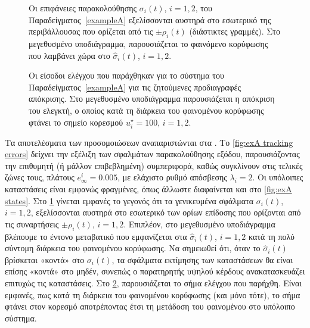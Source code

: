 \begin{figure}[tb]
    \centering
    
    \caption{Οι επιφάνειες παρακολούθησης $\sigma_i(t)$, $i= 1,2$, του Παραδείγματος~\ref{exampleA} εξελίσσονται αυστηρά στο εσωτερικό της περιβάλλουσας που ορίζεται από τις $\pm \rho_i(t)$ (διάστικτες γραμμές). Στο μεγεθυσμένο υποδιάγραμμα, παρουσιάζεται το φαινόμενο κορύφωσης που λαμβάνει χώρα στο $\hat \sigma_i(t)$, $i= 1,2$.}
    \label{fig:exA surfaces}
\end{figure}

\begin{figure}[tb]
    \centering
    
    \caption{Οι είσοδοι ελέγχου που παράχθηκαν για το σύστημα του Παραδείγματος~\ref{exampleA} για τις ζητούμενες προδιαγραφές απόκρισης. Στο μεγεθυσμένο υποδιάγραμμα παρουσιάζεται η απόκριση του ελεγκτή, ο οποίος κατά τη διάρκεια του φαινομένου κορύφωσης φτάνει το σημείο κορεσμού $u_i^\star = 100$, $i =1,2$.}
    \label{fig:exA controls}
\end{figure}

Τα αποτελέσματα των προσομοιώσεων αναπαριστώνται στα . Το \cref{fig:exA tracking errors} δείχνει την εξέλιξη των σφαλμάτων παρακολούθησης εξόδου, παρουσιάζοντας την επιθυμητή (ή μάλλον επιβεβλημένη) συμπεριφορά, καθώς συγκλίνουν στις τελικές ζώνες τους, πλάτους $e_\infty^i = 0.005$, με ελάχιστο ρυθμό απόσβεσης $\lambda_i = 2$. Οι υπόλοιπες καταστάσεις είναι εμφανώς φραγμένες, όπως άλλωστε διαφαίνεται και στο \cref{fig:exA states}. Στο \cref{fig:exA surfaces} γίνεται εμφανές το γεγονός ότι τα γενικευμένα σφάλματα $\sigma_i(t)$, $i=1,2$, εξελίσσονται αυστηρά στο εσωτερικό των ορίων επίδοσης που ορίζονται από τις συναρτήσεις $\pm \rho_i(t)$, $i=1,2$. Επιπλέον, στο μεγεθυσμένο υποδιάγραμμα βλέπουμε το έντονο μεταβατικό που εμφανίζεται στα $\hat \sigma_i(t)$, $i=1,2$ κατά τη πολύ σύντομη διάρκεια του φαινομένου κορύφωσης. Να σημειωθεί ότι, όταν το $\hat \sigma_i(t)$ βρίσκεται «κοντά» στο $\sigma_i(t)$, τα σφάλματα εκτίμησης των καταστάσεων θα είναι επίσης «κοντά» στο μηδέν, συνεπώς ο παρατηρητής υψηλού κέρδους ανακατασκευάζει επιτυχώς τις καταστάσεις. Στο \cref{fig:exA controls}, παρουσιάζεται το σήμα ελέγχου που παρήχθη. Είναι εμφανές, πως κατά τη διάρκεια του φαινομένου κορύφωσης (και μόνο τότε), το σήμα φτάνει στον κορεσμό αποτρέποντας έτσι τη μετάδοση του φαινομένου στο υπόλοιπο σύστημα.



